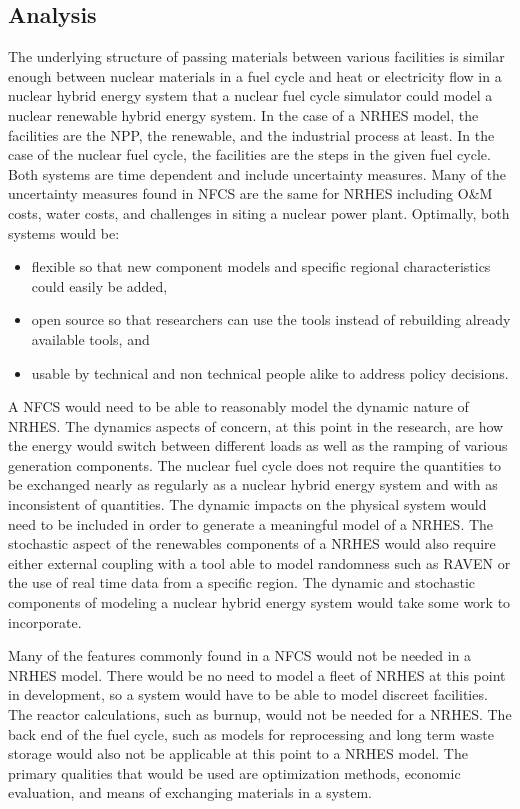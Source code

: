 \documentclass{article}                                                                           %
\begin{document}
\begin{linenumbers}
\section{Analysis}
The underlying structure of passing materials between various facilities is similar enough between nuclear materials in a fuel cycle and heat or electricity flow in a nuclear hybrid energy system that a nuclear fuel cycle simulator could model a nuclear renewable hybrid energy system. In the case of a NRHES model, the facilities are the NPP, the renewable, and the industrial process at least.  In the case of the nuclear fuel cycle, the facilities are the steps in the given fuel cycle. Both systems are time dependent and include uncertainty measures. Many of the uncertainty measures found in NFCS are the same for NRHES including O\&M costs, water costs, and challenges in siting a nuclear power plant. Optimally, both systems would be:
\begin{itemize}

\item flexible so that new component models and specific regional characteristics could easily be added,
\item open source so that researchers can use the tools instead of rebuilding already available tools, and
\item usable by technical and non technical people alike to address policy decisions.

\end{itemize}

A NFCS would need to be able to reasonably model the dynamic nature of NRHES. The dynamics aspects of concern, at this point in the research, are how the energy would switch between different loads as well as the ramping of various generation components.  The nuclear fuel cycle does not require the quantities to be exchanged nearly as regularly as a nuclear hybrid energy system and with as inconsistent of quantities. The dynamic impacts on the physical system would need to be included in order to generate a meaningful model of a NRHES. The stochastic aspect of the renewables components of a NRHES would also require either external coupling with a tool able to model randomness such as RAVEN or the use of real time data from a specific region. The dynamic and stochastic components of modeling a nuclear hybrid energy system would take some work to incorporate.

Many of the features commonly found in a NFCS would not be needed in a NRHES model.  There would be no need to model a fleet of NRHES at this point in development, so a system would have to be able to model discreet facilities.  The reactor calculations, such as burnup, would not be needed for a NRHES.  The back end of the fuel cycle, such as models for reprocessing and long term waste storage would also not be applicable at this point to a NRHES model.  The primary qualities that would be used are optimization methods, economic evaluation, and means of exchanging materials in a system.



\end{linenumbers}
\end{document}
